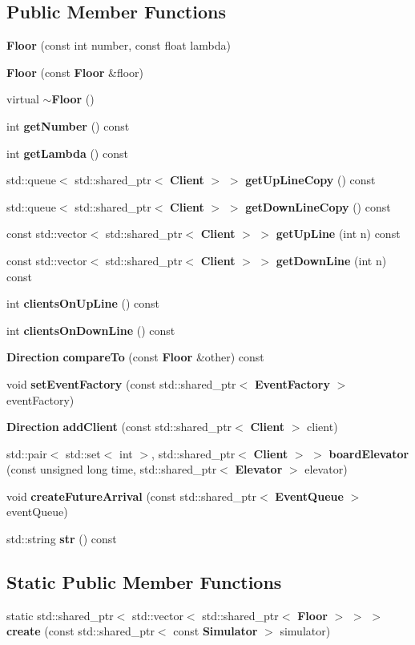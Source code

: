 \subsection*{Public Member Functions}
\begin{DoxyCompactItemize}
\item 
{\bf Floor} (const int number, const float lambda)
\item 
{\bf Floor} (const {\bf Floor} \&floor)
\item 
virtual {\bf $\sim$\+Floor} ()
\item 
int {\bf get\+Number} () const 
\item 
int {\bf get\+Lambda} () const 
\item 
std\+::queue$<$ std\+::shared\+\_\+ptr$<$ {\bf Client} $>$ $>$ {\bf get\+Up\+Line\+Copy} () const 
\item 
std\+::queue$<$ std\+::shared\+\_\+ptr$<$ {\bf Client} $>$ $>$ {\bf get\+Down\+Line\+Copy} () const 
\item 
const std\+::vector$<$ std\+::shared\+\_\+ptr$<$ {\bf Client} $>$ $>$ {\bf get\+Up\+Line} (int n) const 
\item 
const std\+::vector$<$ std\+::shared\+\_\+ptr$<$ {\bf Client} $>$ $>$ {\bf get\+Down\+Line} (int n) const 
\item 
int {\bf clients\+On\+Up\+Line} () const 
\item 
int {\bf clients\+On\+Down\+Line} () const 
\item 
{\bf Direction} {\bf compare\+To} (const {\bf Floor} \&other) const 
\item 
void {\bf set\+Event\+Factory} (const std\+::shared\+\_\+ptr$<$ {\bf Event\+Factory} $>$ event\+Factory)
\item 
{\bf Direction} {\bf add\+Client} (const std\+::shared\+\_\+ptr$<$ {\bf Client} $>$ client)
\item 
std\+::pair$<$ std\+::set$<$ int $>$, std\+::shared\+\_\+ptr$<$ {\bf Client} $>$ $>$ {\bf board\+Elevator} (const unsigned long time, std\+::shared\+\_\+ptr$<$ {\bf Elevator} $>$ elevator)
\item 
void {\bf create\+Future\+Arrival} (const std\+::shared\+\_\+ptr$<$ {\bf Event\+Queue} $>$ event\+Queue)
\item 
std\+::string {\bf str} () const 
\end{DoxyCompactItemize}
\subsection*{Static Public Member Functions}
\begin{DoxyCompactItemize}
\item 
static std\+::shared\+\_\+ptr$<$ std\+::vector$<$ std\+::shared\+\_\+ptr$<$ {\bf Floor} $>$ $>$ $>$ {\bf create} (const std\+::shared\+\_\+ptr$<$ const {\bf Simulator} $>$ simulator)
\end{DoxyCompactItemize}


